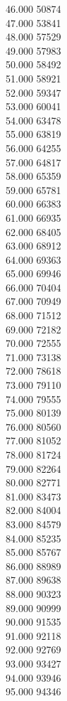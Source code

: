 { 46.000	50874 \\
 47.000	53841 \\
 48.000	57529 \\
 49.000	57983 \\
 50.000	58492 \\
 51.000	58921 \\
 52.000	59347 \\
 53.000	60041 \\
 54.000	63478 \\
 55.000	63819 \\
 56.000	64255 \\
 57.000	64817 \\
 58.000	65359 \\
 59.000	65781 \\
 60.000	66383 \\
 61.000	66935 \\
 62.000	68405 \\
 63.000	68912 \\
 64.000	69363 \\
 65.000	69946 \\
 66.000	70404 \\
 67.000	70949 \\
 68.000	71512 \\
 69.000	72182 \\
 70.000	72555 \\
 71.000	73138 \\
 72.000	78618 \\
 73.000	79110 \\
 74.000	79555 \\
 75.000	80139 \\
 76.000	80560 \\
 77.000	81052 \\
 78.000	81724 \\
 79.000	82264 \\
 80.000	82771 \\
 81.000	83473 \\
 82.000	84004 \\
 83.000	84579 \\
 84.000	85235 \\
 85.000	85767 \\
 86.000	88989 \\
 87.000	89638 \\
 88.000	90323 \\
 89.000	90999 \\
 90.000	91535 \\
 91.000	92118 \\
 92.000	92769 \\
 93.000	93427 \\
 94.000	93946 \\
 95.000	94346 \\
}

